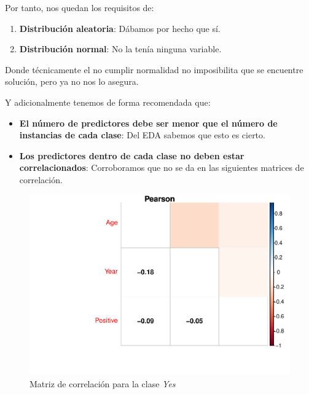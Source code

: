 Por tanto, nos quedan los requisitos de: 
\begin{enumerate}
    \item \textbf{Distribución aleatoria}: Dábamos por hecho que sí.
    \item \textbf{Distribución normal}: No la tenía ninguna variable.
\end{enumerate}

Donde técnicamente el no cumplir normalidad no imposibilita que se encuentre solución, pero ya no nos lo asegura.

\vspace{\baselineskip}
\vspace{\baselineskip}

Y adicionalmente tenemos de forma recomendada que: 
\begin{itemize}
  \item \textbf{El número de predictores debe ser menor que el número de instancias de cada clase}: Del EDA sabemos que esto es cierto.
  \item \textbf{Los predictores dentro de cada clase no deben estar correlacionados}: Corroboramos que no se da en las siguientes matrices de correlación.
\end{itemize}

\vspace{\baselineskip}

\begin{figure}[H]\center\includegraphics[width=.9\linewidth]{img/Clasificacion_files/figure-latex/unnamed-chunk-25-1}\caption{Matriz de correlación para la clase \textit{Yes}}\end{figure}

